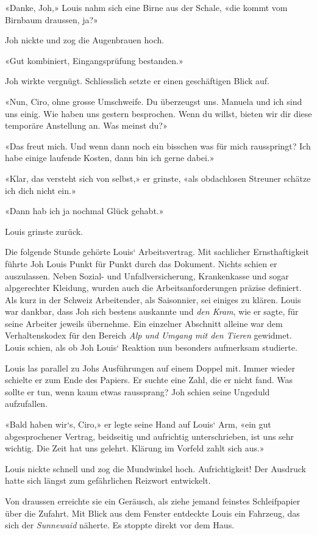 «Danke, Joh,» Louis nahm sich eine Birne aus der Schale, «die kommt vom
Birnbaum draussen, ja?»

Joh nickte und zog die Augenbrauen hoch.

«Gut kombiniert, Eingangsprüfung bestanden.»

Joh wirkte vergnügt. Schliesslich setzte er einen geschäftigen Blick
auf.

«Nun, Ciro, ohne grosse Umschweife. Du überzeugst uns. Manuela und ich
sind uns einig. Wie haben uns gestern besprochen. Wenn du willst, bieten
wir dir diese temporäre Anstellung an. Was meinst du?»

«Das freut mich. Und wenn dann noch ein bisschen was für mich
rausspringt? Ich habe einige laufende Kosten, dann bin ich gerne dabei.»

«Klar, das versteht sich von selbst,» er grinste, «als obdachlosen
Streuner schätze ich dich nicht ein.»

«Dann hab ich ja nochmal Glück gehabt.»

Louis grinste zurück.

Die folgende Stunde gehörte Louis` Arbeitsvertrag. Mit sachlicher
Ernsthaftigkeit führte Joh Louis Punkt für Punkt durch das Dokument.
Nichts schien er auszulassen. Neben Sozial- und Unfallversicherung,
Krankenkasse und sogar alpgerechter Kleidung, wurden auch die
Arbeitsanforderungen präzise definiert. Als kurz in der Schweiz
Arbeitender, als Saisonnier, sei einiges zu klären. Louis war dankbar,
dass Joh sich bestens auskannte und \emph{den Kram}, wie er sagte, für
seine Arbeiter jeweils übernehme. Ein einzelner Abschnitt alleine war
dem Verhaltenskodex für den Bereich \emph{Alp und Umgang mit den Tieren}
gewidmet. Louis schien, als ob Joh Louis` Reaktion nun besonders
aufmerksam studierte.

Louis las parallel zu Johs Ausführungen auf einem Doppel mit. Immer
wieder schielte er zum Ende des Papiers. Er suchte eine Zahl, die er
nicht fand. Was sollte er tun, wenn kaum etwas raussprang? Joh schien
seine Ungeduld aufzufallen.

«Bald haben wir`s, Ciro,» er legte seine Hand auf Louis` Arm, «ein gut
abgesprochener Vertrag, beidseitig und aufrichtig unterschrieben, ist
uns sehr wichtig. Die Zeit hat uns gelehrt. Klärung im Vorfeld zahlt
sich aus.»

Louis nickte schnell und zog die Mundwinkel hoch. Aufrichtigkeit! Der
Ausdruck hatte sich längst zum gefährlichen Reizwort entwickelt.

Von draussen erreichte sie ein Geräusch, als ziehe jemand feinstes
Schleifpapier über die Zufahrt. Mit Blick aus dem Fenster entdeckte
Louis ein Fahrzeug, das sich der \emph{Sunnewaid} näherte. Es stoppte
direkt vor dem Haus.

